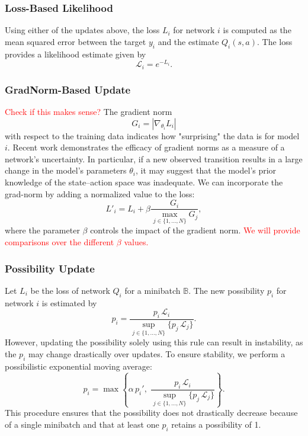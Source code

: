 \documentclass[12pt,a4paper]{report}
\newcommand\myworries[1]{\textcolor{red}{#1}}
\begin{document}
\subsubsection{Loss-Based Likelihood}
Using either of the updates above, the loss \(L_i\) for network \(i\) is computed as the mean squared error between the target \(y_i\) and the estimate \(Q_i(s,a)\). The loss provides a likelihood estimate given by
\[
  \mathcal{L}_i = e^{-L_i}.
\]

\subsubsection{GradNorm-Based Update}
\myworries{Check if this makes sense?}
The gradient norm
\[
  G_i = \left\lvert \nabla_{\theta_i} L_i \right\rvert
\]
with respect to the training data indicates how "surprising" the data is for model \(i\). Recent work \cite{Lee2020} demonstrates the efficacy of gradient norms as a measure of a network's uncertainty. In particular, if a new observed transition results in a large change in the model's parameters \(\theta_i\), it may suggest that the model's prior knowledge of the state–action space was inadequate. We can incorporate the grad-norm by adding a normalized value to the loss:
\[
  L'_i = L_i + \beta \frac{G_i}{\max_{j \in \{1, \dots, N\}} G_j},
\]
where the parameter \(\beta\) controls the impact of the gradient norm. \myworries{We will provide comparisons over the different \(\beta\) values.}

\subsubsection{Possibility Update}
Let \(L_i\) be the loss of network \(Q_i\) for a minibatch \(\mathbb{B}\). The new possibility \(p_i\) for network \(i\) is estimated by
\[
  p_i = \frac{p_i \, \mathcal{L}_i}{\sup_{j \in \{1, \dots, N\}} \{p_j \, \mathcal{L}_j\}}.
\]
However, updating the possibility solely using this rule can result in instability, as the \(p_i\) may change drastically over updates. To ensure stability, we perform a possibilistic exponential moving average:
\[
  p_i = \max \left\{ \alpha\, p_i', \; \frac{p_i \, \mathcal{L}_i}{\sup_{j \in \{1, \dots, N\}} \{p_j \, \mathcal{L}_j\}} \right\}.
\]
This procedure ensures that the possibility does not drastically decrease because of a single minibatch and that at least one \(p_i\) retains a possibility of 1.
\end{document}
